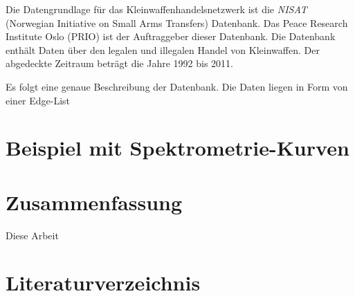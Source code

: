 \documentclass[a4paper,ngerman,oneside,titlepage,11pt]{scrreprt}
\theoremstyle{remark}
\begin{document}
Die Datengrundlage für das Kleinwaffenhandelsnetzwerk ist die \emph{NISAT} (Norwegian Initiative on Small Arms Transfers) Datenbank. Das Peace Research Institute Oslo (PRIO) ist der Auftraggeber dieser Datenbank. Die Datenbank enthält Daten über den legalen und illegalen Handel von Kleinwaffen. Der abgedeckte Zeitraum beträgt die Jahre 1992 bis 2011.

Es folgt eine genaue Beschreibung der Datenbank. Die Daten liegen in Form von einer Edge-List



\chapter{Beispiel mit Spektrometrie-Kurven}

\chapter{Zusammenfassung}

Diese Arbeit 

 



% 
% 
% 
% 
%


\chapter*{Literaturverzeichnis}


\end{document}
